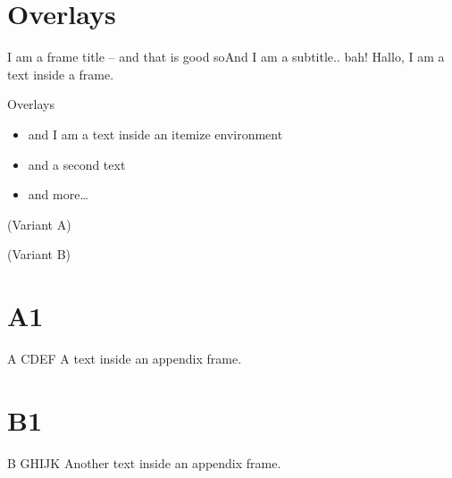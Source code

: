 \documentclass[]{beamer}
\begin{document}
%
%
\section{Overlays}

\begin{frame}{\secname{}}
\end{frame}

\begin{frame}{I am a frame title -- and that is good so}{And I am a subtitle.. bah!}
Hallo, I am a text inside a frame.

\vfill

\begin{block}{Overlays}
\begin{itemize}
\item<+-> and I am a text inside an itemize environment
\item<+-> and a second text
\item<+-> and more\ldots
\end{itemize}
\end{block}
\end{frame}


%
%
\appendix

\begin{frame}[plain]{\appendixname{} (Variant A)}
	\centering
	\appendixname
\end{frame}

\begin{frame}{\appendixname{} (Variant B)}
	\tableofcontents[hideallsubsections]
\end{frame}

%
%
\section{A1}

\begin{frame}{A CDEF}
	A text inside an appendix frame.
\end{frame}

%
%
\section{B1}

\begin{frame}{B GHIJK}
	Another text inside an appendix frame.
\end{frame}
\end{document}
